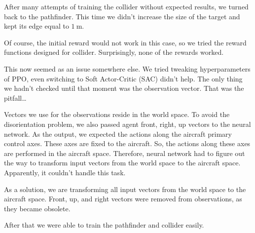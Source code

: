 
After many attempts of training the collider without expected results, we turned back to the pathfinder.
This time we didn't increase the size of the target and kept its edge equal to $\SI{1}{\metre}$.

Of course, the initial reward would not work in this case, so we tried the reward functions designed for collider.
Surprisingly, none of the rewards worked.

This now seemed as an issue somewhere else.
We tried tweaking hyperparameters of PPO, even switching to Soft Actor-Critic (SAC) didn't help.
The only thing we hadn't checked until that moment was the observation vector.
That was the pitfall\ldots

Vectors we use for the observations reside in the world space.
To avoid the disorientation problem, we also passed agent front, right, up vectors to the neural network.
As the output, we expected the actions along the aircraft primary control axes.
These axes are fixed to the aircraft.
So, the actions along these axes are performed in the aircraft space.
Therefore, neural network had to figure out the way to transform input vectors from the world space to the aircraft space.
Apparently, it couldn't handle this task.

As a solution, we are transforming all input vectors from the world space to the aircraft space.
Front, up, and right vectors were removed from observations, as they became obsolete.

After that we were able to train the pathfinder and collider easily. 
